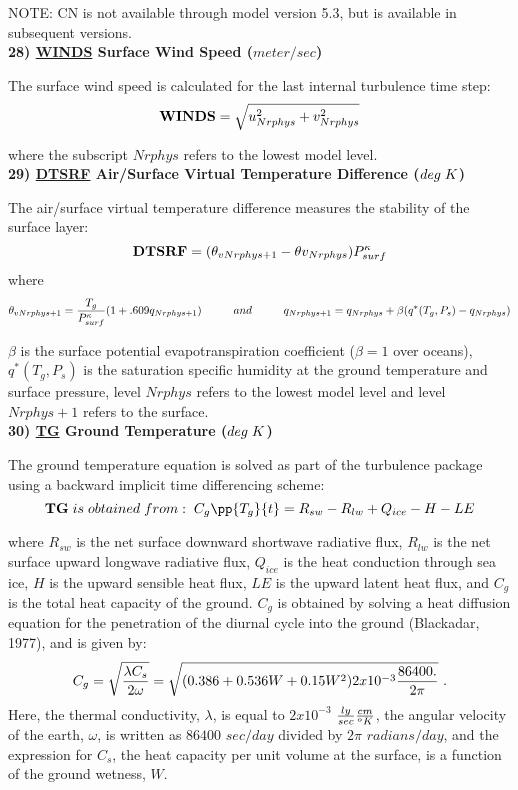 \noindent
NOTE: CN is not available through model version 5.3, but is available in subsequent
versions.
\\

\noindent
{\bf 28)  \underline {WINDS}  Surface Wind Speed ($meter/sec$) }

\noindent
The surface wind speed is calculated for the last internal turbulence time step:
\[
{\bf WINDS} = \sqrt{u_{Nrphys}^2 + v_{Nrphys}^2}
\]

\noindent
where the subscript $Nrphys$ refers to the lowest model level.
\\
 
\noindent
{\bf 29)  \underline {DTSRF}  Air/Surface Virtual Temperature Difference ($deg \hspace{.1cm} K$) }

\noindent
The air/surface virtual temperature difference measures the stability of the surface layer:
\[
{\bf DTSRF} = (\theta_{v{Nrphys+1}} - \theta{v_{Nrphys}}) P^{\kappa}_{surf}
\]
\noindent
where
\[
\theta_{v{Nrphys+1}} = { T_g \over {P^{\kappa}_{surf}} } (1 + .609 q_{Nrphys+1}) \hspace{1cm}
and \hspace{1cm} q_{Nrphys+1} = q_{Nrphys} + \beta(q^*(T_g,P_s) - q_{Nrphys})
\]

\noindent
$\beta$ is the surface potential evapotranspiration coefficient ($\beta=1$ over oceans),
$q^*(T_g,P_s)$ is the saturation specific humidity at the ground temperature 
and surface pressure, level $Nrphys$ refers to the lowest model level and level $Nrphys+1$ 
refers to the surface.
\\

 
\noindent
{\bf 30)  \underline {TG}  Ground Temperature ($deg \hspace{.1cm} K$) }

\noindent
The ground temperature equation is solved as part of the turbulence package
using a backward implicit time differencing scheme:
\[
{\bf TG} \hspace{.1cm} is \hspace{.1cm} obtained \hspace{.1cm} from: \hspace{.1cm}
C_g\pp{T_g}{t} = R_{sw} - R_{lw} + Q_{ice} - H - LE
\]

\noindent
where $R_{sw}$ is the net surface downward shortwave radiative flux, $R_{lw}$ is the
net surface upward longwave radiative flux, $Q_{ice}$ is the heat conduction through
sea ice, $H$ is the upward sensible heat flux, $LE$ is the upward latent heat
flux, and $C_g$ is the total heat capacity of the ground. 
$C_g$ is obtained by solving a heat diffusion equation 
for the penetration of the diurnal cycle into the ground (Blackadar, 1977), and is given by:
\[
C_g = \sqrt{ {\lambda C_s \over {2 \omega} } } = \sqrt{(0.386 + 0.536W + 0.15W^2)2x10^{-3}
{ 86400. \over {2 \pi} } } \, \, .
\]
\noindent
Here, the thermal conductivity, $\lambda$, is equal to $2x10^{-3}$ ${ly\over{ sec}} 
{cm \over {^oK}}$, 
the angular velocity of the earth, $\omega$, is written as $86400$ $sec/day$ divided 
by $2 \pi$ $radians/
day$, and the expression for $C_s$, the heat capacity per unit volume at the surface, 
is a function of the ground wetness, $W$. 
\\

